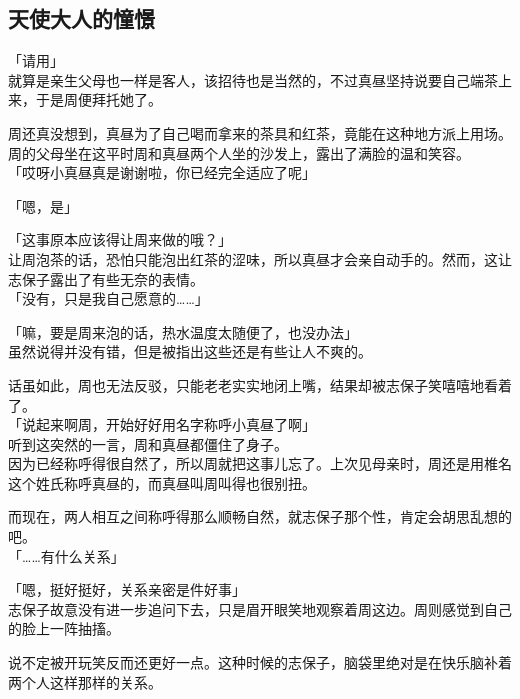 \subsection{天使大人的憧憬}

「请用」\\

就算是亲生父母也一样是客人，该招待也是当然的，不过真昼坚持说要自己端茶上来，于是周便拜托她了。

周还真没想到，真昼为了自己喝而拿来的茶具和红茶，竟能在这种地方派上用场。\\

周的父母坐在这平时周和真昼两个人坐的沙发上，露出了满脸的温和笑容。\\

「哎呀小真昼真是谢谢啦，你已经完全适应了呢」

「嗯，是」

「这事原本应该得让周来做的哦？」\\

让周泡茶的话，恐怕只能泡出红茶的涩味，所以真昼才会亲自动手的。然而，这让志保子露出了有些无奈的表情。\\

「没有，只是我自己愿意的……」

「嘛，要是周来泡的话，热水温度太随便了，也没办法」\\

虽然说得并没有错，但是被指出这些还是有些让人不爽的。

话虽如此，周也无法反驳，只能老老实实地闭上嘴，结果却被志保子笑嘻嘻地看着了。\\

「说起来啊周，开始好好用名字称呼小真昼了啊」\\

听到这突然的一言，周和真昼都僵住了身子。\\

因为已经称呼得很自然了，所以周就把这事儿忘了。上次见母亲时，周还是用椎名这个姓氏称呼真昼的，而真昼叫周叫得也很别扭。

而现在，两人相互之间称呼得那么顺畅自然，就志保子那个性，肯定会胡思乱想的吧。\\

「……有什么关系」

「嗯，挺好挺好，关系亲密是件好事」\\

志保子故意没有进一步追问下去，只是眉开眼笑地观察着周这边。周则感觉到自己的脸上一阵抽搐。

说不定被开玩笑反而还更好一点。这种时候的志保子，脑袋里绝对是在快乐脑补着两个人这样那样的关系。\\

